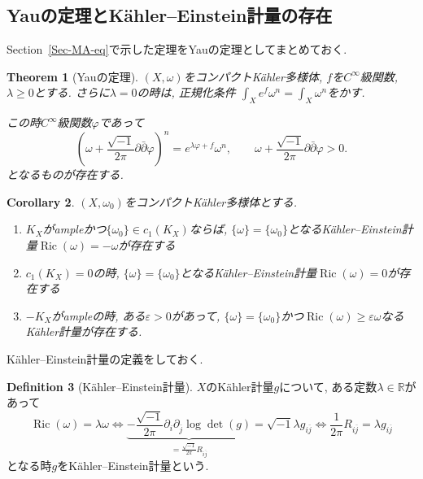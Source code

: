 \documentclass[dvipdfmx,a4paper,11pt]{article} %
\newtheorem{thm}{Theorem}[section]
\newtheorem{cor}[thm]{Corollary}
\theoremstyle{definition}
\newtheorem{defn}[thm]{Definition}
\theoremstyle{remark}
\numberwithin{equation}{section}
\DeclareMathOperator{\Ric}{Ric}
\newcommand{\R}{\mathbb{R}}
\begin{document}
\subsection{Yauの定理とK\"ahler--Einstein計量の存在}
Section~\ref{Sec-MA-eq}で示した定理をYauの定理としてまとめておく.

\begin{thm}[Yauの定理]
\label{thm-Yau-theorem}
$(X, \omega)$をコンパクトK\"ahler多様体, $f$を$C^{\infty}$級関数, $\lambda\geq 0$とする. 
さらに$\lambda=0$の時は, 正規化条件
\(\int_X e^f\omega^n=\int_X\omega^n\)をかす.

この時$C^{\infty}$級関数\(\varphi\)であって
\[
\left(\omega+\frac{\sqrt{-1}}{2\pi}\partial\bar\partial\varphi\right)^n=e^{\lambda\varphi+f}\omega^n,
\qquad
\omega+\frac{\sqrt{-1}}{2\pi}\partial\bar\partial\varphi>0.
\]
となるものが存在する. 
\end{thm}

\begin{cor}
\label{cor-Yau-thm}
$(X, \omega_0)$をコンパクトK\"ahler多様体とする. 
\begin{enumerate}
\item $K_X$がampleかつ$\{\omega_0\} \in c_1(K_X)$ならば, $\{ \omega\}=\{\omega_0\}$となるK\"ahler--Einstein計量$\Ric(\omega)=-\omega$が存在する
\item $c_1(K_X) =  0$の時, $\{ \omega\}=\{\omega_0\}$となるK\"ahler--Einstein計量$\Ric(\omega)=0$が存在する
\item $-K_X$がampleの時, ある$\varepsilon>0$があって, $\{ \omega\}=\{\omega_0\}$かつ$\Ric(\omega) \geq \varepsilon \omega$なるK\"ahler計量が存在する.
\end{enumerate}
\end{cor}

K\"ahler--Einstein計量の定義をしておく. 
\begin{defn}[K\"ahler--Einstein計量]
$X$のK\"ahler計量$g$について, ある定数$\lambda \in \R$があって
\[
\Ric(\omega)=\lambda \omega
\Leftrightarrow
\underbrace{-\frac{\sqrt{-1}}{2\pi}\partial_i \partial_{\overline{j}} \log \det(g)}_{=\frac{\sqrt{-1}}{2\pi}R_{i \overline{j}}}
= \sqrt{-1}\lambda g_{i \overline{j}}
\Leftrightarrow
\frac{1}{2\pi}
R_{i \overline{j}}=\lambda g_{i \overline{j}}
\]
となる時$g$をK\"ahler--Einstein計量という. 
\end{defn}
\end{document}
